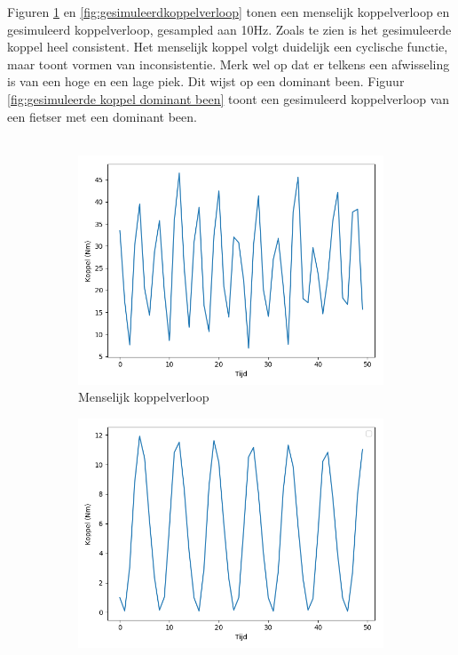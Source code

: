 \documentclass[12pt,a4paper,oneside]{book}
\begin{document}
Figuren \ref{fig:menselijkkoppelverloop} en \ref{fig:gesimuleerdkoppelverloop} tonen een menselijk koppelverloop en gesimuleerd koppelverloop, gesampled aan 10Hz. Zoals te zien is het gesimuleerde koppel heel consistent. Het menselijk koppel volgt duidelijk een cyclische functie, maar toont vormen van inconsistentie. Merk wel op dat er telkens een afwisseling is van een hoge en een lage piek. Dit wijst op een dominant been. Figuur \ref{fig:gesimuleerde koppel dominant been} toont een gesimuleerd koppelverloop van een fietser met een dominant been.
\\\\
\begin{figure}[t!]
\centering
\begin{subfigure}{.5\textwidth}
  \centering
  \includegraphics[width=\linewidth]{images/menselijkkoppel.png}
  \caption{Menselijk koppelverloop}
  \label{fig:menselijkkoppelverloop}
\end{subfigure}%
\begin{subfigure}{.5\textwidth}
  \centering
  \includegraphics[width=\linewidth]{images/gesimuleerdekoppel.png}

\end{subfigure}
\end{figure}
\end{document}
